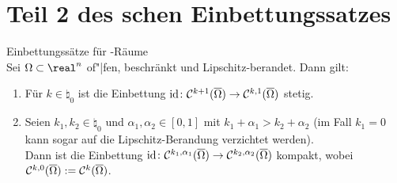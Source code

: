\section{%
    Teil 2 des schen Einbettungssatzes%
}

\begin{Lemma}{Einbettungssätze für -Räume}\\
    Sei $\Omega \subset \real^n$ of"|fen, beschränkt und Lipschitz-berandet.
    Dann gilt:
    \begin{enumerate}
        \item
        Für $k \in \natural_0$ ist die Einbettung
        $\text{id}\colon \mathcal{C}^{k+1}(\overline{\Omega}) \to \mathcal{C}^{k,1}(\overline{\Omega})$ stetig.

        \item
        Seien $k_1, k_2 \in \natural_0$ und $\alpha_1, \alpha_2 \in [0, 1]$ mit
        $k_1 + \alpha_1 > k_2 + \alpha_2$
        (im Fall $k_1 = 0$ kann sogar auf die Lipschitz-Berandung verzichtet werden).\\
        Dann ist die Einbettung $\text{id}\colon \mathcal{C}^{k_1,\alpha_1}(\overline{\Omega}) \to
        \mathcal{C}^{k_2,\alpha_2}(\overline{\Omega})$ kompakt,
        wobei $\mathcal{C}^{k,0}(\overline{\Omega}) := \mathcal{C}^k(\overline{\Omega})$.
    \end{enumerate}
\end{Lemma}

